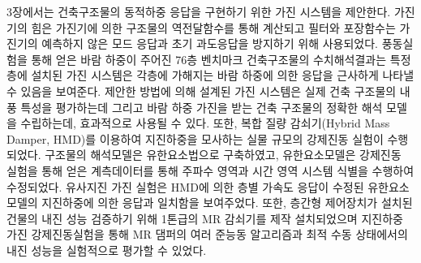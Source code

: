 3장에서는 건축구조물의 동적하중 응답을 구현하기 위한 가진 시스템을 제안한다. 가진기의 힘은 가진기에 의한 구조물의 역전달함수를 통해 계산되고 필터와 포장함수는 가진기의 예측하지 않은 모드 응답과 초기 과도응답을 방지하기 위해 사용되었다. 풍동실험을 통해 얻은 바람 하중이 주어진 76층 벤치마크 건축구조물의 수치해석결과는 특정 층에 설치된 가진 시스템은 각층에 가해지는 바람 하중에 의한 응답을 근사하게 나타낼 수 있음을 보여준다. 제안한 방법에 의해 설계된 가진 시스템은 실제 건축 구조물의 내풍 특성을 평가하는데 그리고 바람 하중 가진을 받는 건축 구조물의 정확한 해석 모델을 수립하는데, 효과적으로 사용될 수 있다. 또한, 복합 질량 감쇠기(Hybrid Mass Damper, HMD)를 이용하여 지진하중을 모사하는 실물 규모의 강제진동 실험이 수행되었다. 구조물의 해석모델은 유한요소법으로 구축하였고, 유한요소모델은 강제진동 실험을 통해 얻은 계측데이터를 통해 주파수 영역과 시간 영역 시스템 식별을 수행하여 수정되었다. 유사지진 가진 실험은 HMD에 의한 층별 가속도 응답이 수정된 유한요소 모델의 지진하중에 의한 응답과 일치함을 보여주었다. 또한, 층간형 제어장치가 설치된 건물의 내진 성능 검증하기 위해 1톤급의 MR 감쇠기를 제작 설치되었으며 지진하중 가진 강제진동실험을 통해 MR 댐퍼의 여러 준능동 알고리즘과 최적 수동 상태에서의 내진 성능을 실험적으로 평가할 수 있었다.

